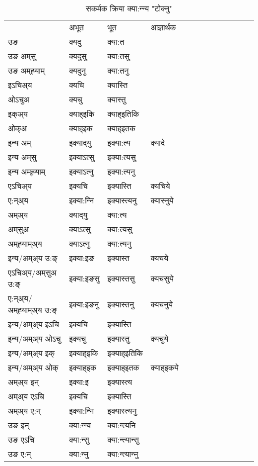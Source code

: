\begin{table}[H]
\centering
\caption{\label{ɛt.vt} सकर्मक क्रिया  क्या:न्‍न्य  "टोक्नु"  }
\begin{tabular}{l|l|l|l|l|l|l|l|l|l|l|l|l}  \toprule
&अभूत & भूत & आज्ञार्थक \\ 
उङ &क्यदु &क्या:त \\ 
उङ अम्‌सु &क्यदुसु &क्या:तसु \\ 
उङ अम्‌ह्‍याम् &क्यदुनु &क्या:तनु \\ 
इऽचिअ्य &क्यचि &क्यास्ति   \\ 
ओऽचुअ &क्यचु &क्यास्तु   \\ 
इक्अ्य &क्याह्इकि &क्याह्इतिकि   \\ 
ओक्अ &क्याह्इक &क्याह्इतक   \\ 
इन्य अम् & इक्याद्‌यु  & इक्या:त्य &क्यादे  \\ 
इन्य अम्‌सु & इक्याऽत्सु  & इक्या:त्यसु   \\ 
इन्य अम्‌ह्‍याम् & इक्याऽत्‍नु  & इक्या:त्यनु   \\ 
एऽचिअ्य & इक्यचि & इक्यास्ति &क्यचिये    \\ 
ए:न्अ्य & इक्या:न्‍नि  & इक्यास्त्यनु &क्यास्‍नुये  \\ 
अम्अ्य & क्याद्‌यु  & क्या:त्य  \\ 
अम्‌सुअ & क्याऽत्सु & क्या:त्यसु  \\ 
अम्‌ह्‍याम्अ्य & क्याऽत्‍नु  & क्या:त्यनु \\ 
\midrule
इन्य/अम्अ्य उ:ङ्‌&इक्या:इङ & इक्यास्त &क्यचये \\ 
एऽचिअ्य/अम्‌सुअ उ:ङ्‌ &इक्या:इङसु & इक्यास्तसु &क्यचसुये \\ 
ए:न्अ्य/अम्‌ह्‍याम्अ्य उ:ङ्‌ &इक्या:इङनु & इक्यास्तनु &क्यचनुये \\ 
इन्य/अम्अ्य इऽचि & इक्यचि & इक्यास्ति    \\ 
इन्य/अम्अ्य ओऽचु & इक्यचु & इक्यास्तु  &क्यचुये  \\ 
इन्य/अम्अ्य इक् & इक्याह्इकि & इक्याह्इतिकि   \\ 
इन्य/अम्अ्य ओक् & इक्याह्इक & इक्याह्इतक  &क्याह्इकये  \\ 
अम्अ्य इन् & इक्या:इ & इक्यास्त्य   \\ 
अम्अ्य एऽचि & इक्यचि & इक्यास्ति    \\ 
अम्अ्य ए:न् & इक्या:न्‍नि  & इक्यास्त्यनु  \\ 
\midrule
उङ इन् & क्या:न्‍न्य  & क्या:न्त्यनि  \\ 
उङ एऽचि & क्या:न्सु  & क्या:न्त्यान्सु   \\ 
उङ ए:न्& क्या:न्‍नु  & क्या:न्त्यान्‍नु   \\ 
\bottomrule
\end{tabular}
\end{table}


